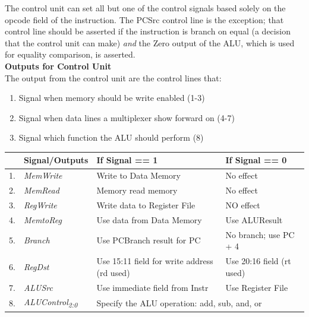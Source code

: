 \documentclass[12pt]{article}
\theoremstyle{definition}
\begin{document}
  The control unit can set all but one of the control signals based solely on the opcode field of the instruction.
  The PCSrc control line is the exception; that control line should be asserted if the instruction is branch on equal (a decision that the control unit can make) \emph{and} the Zero output of the ALU, which is used for equality comparison, is asserted. \\

  \textbf{Outputs for Control Unit} \\
  The output from the control unit are the control lines that:
  \begin{enumerate}
    \item Signal when memory should be write enabled (1-3)
    \item Signal when data lines a multiplexer show forward on (4-7)
    \item Signal which function the ALU should perform (8)
  \end{enumerate}
  \begin{tabular}{c || l | p{5cm} | l}
  & Signal/Outputs & If Signal == 1 & If Signal == 0 \\ \hline \hline
  1. & \emph{MemWrite} & Write to Data Memory & No effect \\ \hline
  2. & \emph{MemRead} & Memory read memory & No effect \\ \hline
  3. & \emph{RegWrite} & Write data to Register File & NO effect \\ \hline
  4. & \emph{MemtoReg} & Use data from Data Memory & Use ALUResult \\ \hline
  5. & \emph{Branch} & Use PCBranch result for PC & No branch; use PC + 4 \\ \hline
  6. & \emph{RegDst} & Use 15:11 field for write address (rd used) & Use 20:16 field (rt used) \\ \hline
  7. & \emph{ALUSrc} & Use immediate field from Instr & Use Register File \\ \hline
  8. & \emph{ALUControl\textsubscript{2:0}} &
  \multicolumn{2}{l}{Specify the ALU operation: add, sub, and, or}
  \end{tabular} \\
\end{document}
